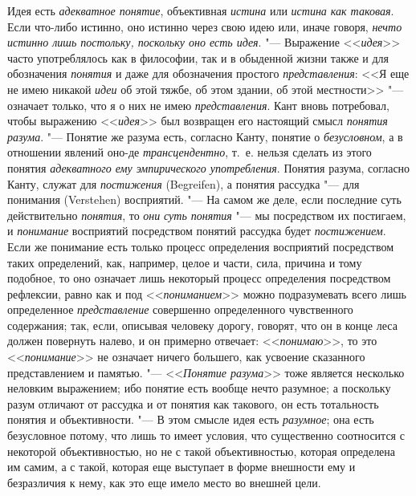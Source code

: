 Идея есть {\em адекватное понятие}, объективная
{\em истина} или
{\em истина как таковая}.
Если что-либо истинно, оно истинно через свою идею или, иначе
говоря, {\em нечто истинно лишь
постольку, поскольку оно есть идея}. "--- Выражение
<<{\em идея}>> часто
употреблялось как в философии, так и в обыденной жизни также и для
обозначения {\em понятия}
и даже для обозначения простого
{\em представления}: <<Я
еще не имею никакой {\em идеи}
об этой тяжбе, об этом здании, об этой местности>>
"--- означает только, что я о них не имею
{\em представления}. Кант
вновь потребовал, чтобы выражению
<<{\em идея}>> был
возвращен его настоящий смысл
{\em понятия разума}.
"--- Понятие же разума есть, согласно Канту, понятие о
{\em безусловном}, а в
отношении явлений оно-де
{\em трансцендентно},
т.~е. нельзя сделать из этого понятия
{\em адекватного ему эмпирического
употребления}. Понятия разума, согласно Канту, служат для
{\em постижения} (Begreifen),
а понятия рассудка "--- для понимания (Verstehen)
восприятий. "--- На самом же деле, если последние суть
действительно {\em понятия},
то {\em они}
{\em суть понятия} "--- мы
посредством их постигаем, и
{\em понимание}
восприятий посредством понятий рассудка будет
{\em постижением}. Если
же понимание есть только процесс определения восприятий посредством таких
определений, как, например, целое и части, сила, причина и тому подобное,
то оно означает лишь некоторый процесс определения посредством рефлексии,
равно как и под <<{\em пониманием}>>
можно подразумевать всего лишь определенное
{\em представление}
совершенно определенного чувственного содержания; так, если,
описывая человеку дорогу, говорят, что он в конце леса должен повернуть
налево, и он примерно отвечает:
<<{\em понимаю}>>, то это
<<{\em понимание}>> не
означает ничего большего, как усвоение сказанного представлением и
памятью. "--- <<{\em Понятие разума}>>
тоже является несколько неловким выражением; ибо понятие есть
вообще нечто разумное; а поскольку разум отличают от рассудка и от понятия
как такового, он есть тотальность понятия и объективности. "---
В этом смысле идея есть
{\em разумное}; она есть
безусловное потому, что лишь то имеет условия, что существенно соотносится
с некоторой объективностью, но не с такой объективностью, которая
определена им самим, а с такой, которая еще выступает в форме внешности ему
и безразличия к нему, как это еще имело место во внешней цели.

